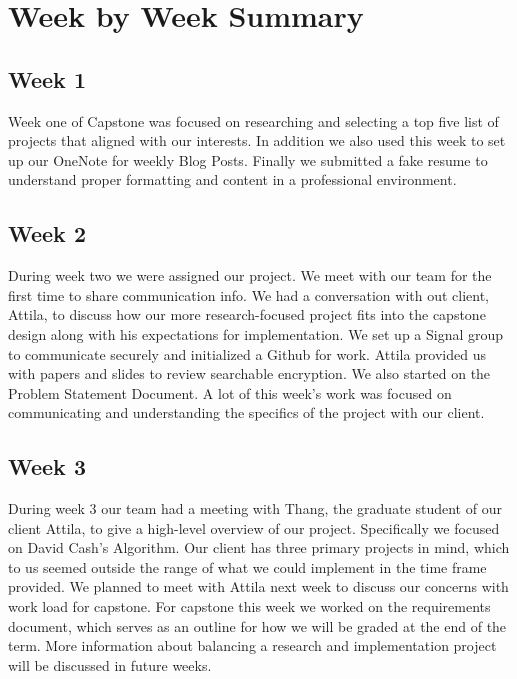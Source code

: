 \documentclass[onecolumn, draftclsnofoot,10pt, compsoc]{IEEEtran}
\begin{document}
\begin{comment}
* logistical challenges
	* scott commuting from eugene
    * other scott being in ROTC
    * everybody working 
* client gone for a week in middle of term
* understanding the project
* understanding how a research project fits into capstone
	* adapting assignments for a research project
* convincing attila to narrow the project scope
\end{comment}

\section {Week by Week Summary}

\subsection{Week 1} %
Week one of Capstone was focused on researching and selecting a top five list of projects that aligned with our interests. In addition we also used this week to set up our OneNote for weekly Blog Posts. Finally we submitted a fake resume to understand proper formatting and content in a professional environment.

\subsection{Week 2} %
During week two we were assigned our project. We meet with our team for the first time to share communication info. We had a conversation with out client, Attila, to discuss how our more research-focused project fits into the capstone design along with his expectations for implementation. We set up a Signal group to communicate securely and initialized a Github for work. Attila provided us with papers and slides to review searchable encryption. We also started on the Problem Statement Document. A lot of this week's work was focused on communicating and understanding the specifics of the project with our client.

\subsection{Week 3} %
During week 3 our team had a meeting with Thang, the graduate student of our client Attila, to give a high-level overview of our project. Specifically we focused on David Cash's Algorithm. Our client has three primary projects in mind, which to us seemed outside the range of what we could implement in the time frame provided. We planned to meet with Attila next week to discuss our concerns with work load for capstone. For capstone this week we worked on the requirements document, which serves as an outline for how we will be graded at the end of the term. More information about balancing a research and implementation project will be discussed in future weeks.
\end{document}
